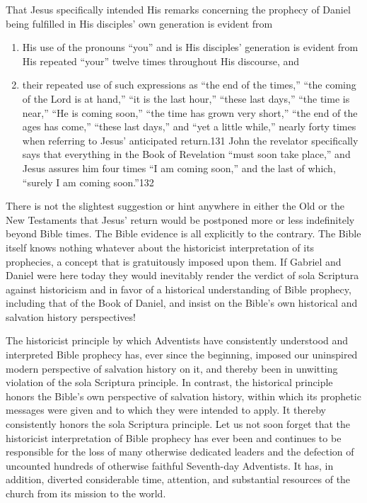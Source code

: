 That Jesus specifically intended His remarks concerning the prophecy of
Daniel being fulfilled in His disciples' own generation is evident from 
\begin{enumerate}
\item
His use of the pronouns ``you'' and is His disciples' generation is
evident from His repeated ``your'' twelve times throughout His discourse, and 
\item
their repeated use of such expressions as ``the end of the times,'' ``the
coming of the Lord is at hand,'' ``it is the last hour,'' ``these last days,''
``the time is near,'' ``He is coming soon,'' ``the time has grown very short,''
``the end of the ages has come,'' ``these last days,'' and ``yet a little while,''
nearly forty times when referring to Jesus' anticipated return.131 John the
revelator specifically says that everything in the Book of Revelation ``must
soon take place,'' and Jesus assures him four times ``I am coming soon,'' and
the last of which, ``surely I am coming soon.''132
\end{enumerate}

There is not the slightest suggestion or hint anywhere in either the Old or
the New Testaments that Jesus' return would be postponed more or less
indefinitely beyond Bible times. The Bible evidence is all explicitly to the
contrary. The Bible itself knows nothing whatever about the historicist
interpretation of its prophecies, a concept that is gratuitously imposed
upon them. If Gabriel and Daniel were here today they would inevitably
render the verdict of sola Scriptura against historicism and in favor of a
historical understanding of Bible prophecy, including that of the Book of
Daniel, and insist on the Bible's own historical and salvation history
perspectives! 

The historicist principle by which Adventists have consistently understood
and interpreted Bible prophecy has, ever since the beginning, imposed our
uninspired modern perspective of salvation history on it, and thereby been
in unwitting violation of the sola Scriptura principle. In contrast, the
historical principle honors the Bible's own perspective of salvation
history, within which its prophetic messages were given and to which they
were intended to apply. It thereby consistently honors the sola Scriptura
principle. Let us not soon forget that the historicist interpretation of
Bible prophecy has ever been and continues to be responsible for the loss of
many otherwise dedicated leaders and the defection of uncounted hundreds of
otherwise faithful Seventh-day Adventists. It has, in addition, diverted
considerable time, attention, and substantial resources of the church from
its mission to the world.

